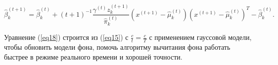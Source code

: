 \begin{equation}\label{eq20}
\hat{\beta}^{\left(t+1\right)}_k = \hat{\beta}^{\left(t\right)}_k + \left(t+1\right)^{-1} \frac{\gamma^{\left(t\right)}z^{\left(t+1\right)}_k}{\hat{\pi}^{\left(t\right)}_k} \left(x^{\left(t+1\right)}-\hat{\mu}^{\left(t\right)}_k\right)\left(x^{\left(t+1\right)}-\hat{\mu}^{\left(t\right)}_k\right)^T - \hat{\beta}^{\left(t\right)}_k.
\end{equation}

Уравнение (\ref{eq18}) строится из (\ref{eq15}) с $\frac{c}{t}=\frac{c}{T}$  с применением гауссовой модели, чтобы обновить модели фона, помочь алгоритму вычитания фона работать быстрее в режиме реального времени и хорошей точности.



